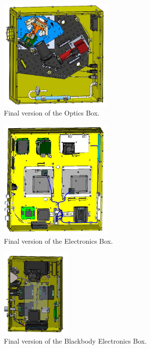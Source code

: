 \begin{figure}
    \centering
    \includegraphics[width=0.5\textwidth]{chap3_images/LIFE_V5_final_images/Optics_Box_final.JPG}
    \caption{Final version of the Optics Box.}
    \label{fig:OBOX_FINAL}
\end{figure}

\begin{figure}
    \centering
    \includegraphics[width=0.5\textwidth]{chap3_images/LIFE_V5_final_images/EBOX_V3_final.JPG}
    \caption{Final version of the Electronics Box.}
    \label{fig:EBOX_FINAL}
\end{figure}

\begin{figure}
    \centering
    \includegraphics[width=0.31\textwidth]{chap3_images/LIFE_V5_final_images/BBEbox_final.JPG}
    \caption{Final version of the Blackbody Electronics Box.}
    \label{fig:BBEBOX_FINAL}
\end{figure}

